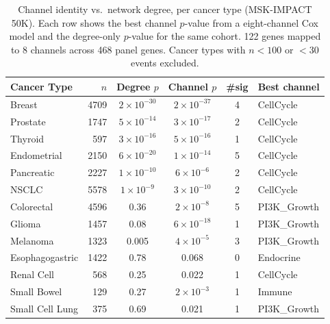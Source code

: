 \documentclass[11pt]{article}
\begin{document}
\begin{table}[ht]
\centering
\caption{Channel identity vs.\ network degree, per cancer type
(MSK-IMPACT 50K). Each row shows the best channel $p$-value from a
eight-channel Cox model and the degree-only $p$-value for the same
cohort. 122 genes mapped to 8 channels across 468 panel genes.
Cancer types with $n < 100$ or $<30$ events excluded.}
\label{tab:degree-vs-channel}
\medskip
\small
\begin{tabular*}{\textwidth}{@{\extracolsep{\fill}}lrcccl@{}}
\toprule
Cancer Type & $n$ & Degree $p$ & Channel $p$ & \#sig & Best channel \\
\midrule
Breast                    & 4709 & $2 \times 10^{-30}$ & $2 \times 10^{-37}$ & 4 & CellCycle \\
Prostate                  & 1747 & $5 \times 10^{-14}$ & $3 \times 10^{-17}$ & 2 & CellCycle \\
Thyroid                   &  597 & $3 \times 10^{-16}$ & $5 \times 10^{-16}$ & 1 & CellCycle \\
Endometrial               & 2150 & $6 \times 10^{-20}$ & $1 \times 10^{-14}$ & 5 & CellCycle \\
Pancreatic                & 2227 & $1 \times 10^{-10}$ & $6 \times 10^{-6}$  & 2 & CellCycle \\
NSCLC                     & 5578 & $1 \times 10^{-9}$  & $3 \times 10^{-10}$ & 2 & CellCycle \\
\midrule
Colorectal                & 4596 & 0.36                & $2 \times 10^{-8}$  & 5 & PI3K\_Growth \\
Glioma                    & 1457 & 0.08                & $6 \times 10^{-18}$ & 1 & PI3K\_Growth \\
Melanoma                  & 1323 & 0.005               & $4 \times 10^{-5}$  & 3 & PI3K\_Growth \\
Esophagogastric           & 1422 & 0.78                & 0.068               & 0 & Endocrine \\
Renal Cell                &  568 & 0.25                & 0.022               & 1 & CellCycle \\
Small Bowel               &  129 & 0.27                & $2 \times 10^{-3}$  & 1 & Immune \\
Small Cell Lung           &  375 & 0.69                & 0.021               & 1 & PI3K\_Growth \\
\bottomrule
\end{tabular*}
\end{table}
\end{document}
